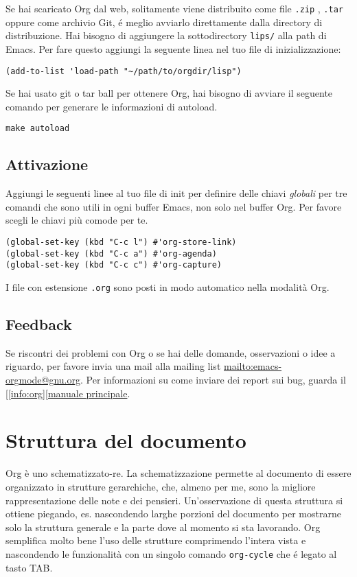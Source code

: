 \documentclass[11pt]{article}
\begin{document}
Se hai scaricato Org dal web, solitamente viene distribuito come file
\texttt{.zip} , \texttt{.tar} oppure come archivio Git, é meglio avviarlo
direttamente dalla directory di distribuzione. Hai bisogno di
aggiungere la sottodirectory \texttt{lips/} alla path di Emacs. Per fare
questo aggiungi la seguente linea nel tuo file di inizializzazione:

\begin{verbatim}
(add-to-list 'load-path "~/path/to/orgdir/lisp")
\end{verbatim}


Se hai usato git o tar ball per ottenere Org, hai bisogno di avviare il
seguente comando per generare le informazioni di autoload.

\begin{verbatim}
make autoload
\end{verbatim}

\subsection*{Attivazione}
\label{sec:orgb24a1ce}
Aggiungi le seguenti linee al tuo file di init per definire delle chiavi
\emph{globali} per tre comandi che sono utili in ogni buffer Emacs, non solo nel
buffer Org. Per favore scegli le chiavi più comode per te.

\begin{verbatim}
(global-set-key (kbd "C-c l") #'org-store-link)
(global-set-key (kbd "C-c a") #'org-agenda)
(global-set-key (kbd "C-c c") #'org-capture)
\end{verbatim}

I file con estensione \texttt{.org} sono posti in modo automatico nella modalità
Org.

\subsection*{Feedback}
\label{sec:org61a5e86}
Se riscontri dei problemi con Org o se hai delle domande, osservazioni o
idee a riguardo, per favore invia una mail alla mailing list
\url{mailto:emacs-orgmode@gnu.org}.  Per informazioni su come inviare dei report
sui bug, guarda il \href{manual}{[[info:org][manuale principale}.

\section{Struttura del documento}
\label{sec:orgdcc49a7}
Org è uno schematizzato-re. La schematizzazione permette al documento
di essere organizzato in strutture gerarchiche, che, almeno per me,
sono la migliore rappresentazione delle note e dei
pensieri. Un'osservazione di questa struttura si ottiene piegando,
es. nascondendo larghe porzioni del documento per mostrarne solo la
struttura generale e la parte dove al momento si sta lavorando. Org
semplifica molto bene l'uso delle strutture comprimendo l'intera vista e
nascondendo le funzionalità con un singolo comando \texttt{org-cycle} che é
legato al tasto TAB.
\end{document}
